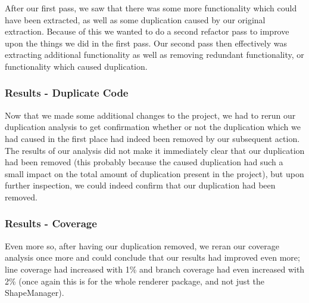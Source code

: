 \documentclass{article}
\begin{document}
After our first pass, we saw that there was some more functionality which could have been extracted, as well as some duplication caused by our original extraction. Because of this we wanted to do a second refactor pass to improve upon the things we did in the first pass. Our second pass then effectively was extracting additional functionality as well as removing redundant functionality, or functionality which caused duplication.

\subsubsection{Results - Duplicate Code}

Now that we made some additional changes to the project, we had to rerun our duplication analysis to get confirmation whether or not the duplication which we had caused in the first place had indeed been removed by our subsequent action. The results of our analysis did not make it immediately clear that our duplication had been removed (this probably because the caused duplication had such a small impact on the total amount of duplication present in the project), but upon further inspection, we could indeed confirm that our duplication had been removed.

\subsubsection{Results - Coverage}

Even more so, after having our duplication removed, we reran our coverage analysis once more and could conclude that our results had improved even more; line coverage had increased with 1\% and branch coverage had even increased with 2\% (once again this is for the whole renderer package, and not just the ShapeManager).
\end{document}
